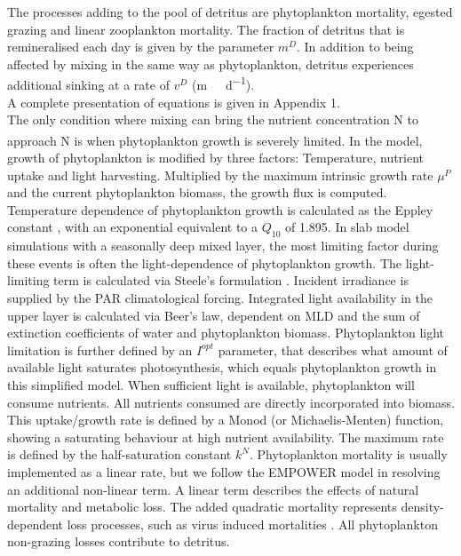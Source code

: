 \documentclass[template.tex]{subfiles}
\begin{document}
The processes adding to the pool of detritus are phytoplankton mortality, egested grazing and linear zooplankton mortality. The fraction of detritus that is remineralised each day is given by the parameter $m
^D$. In addition to being affected by mixing in the same way as phytoplankton, detritus experiences additional sinking at a rate of $v^D$ (\unit{m \ d^{-1}}).\\

A complete presentation of equations is given in Appendix 1.\\


The only condition where mixing can bring the nutrient concentration N to approach \unit{N^\emptyset} is when phytoplankton growth is severely limited. In the model, growth of phytoplankton is modified by three factors: Temperature, nutrient uptake and light harvesting. Multiplied by the maximum intrinsic growth rate $\mu^P$ and the current phytoplankton biomass, the growth flux is computed. Temperature dependence of phytoplankton growth is calculated as the Eppley constant \citep{Eppley1972TemperatureSea}, with an exponential equivalent to a $Q_{10}$ of 1.895.
In slab model simulations with a seasonally deep mixed layer, the most limiting factor during these events is often the light-dependence of phytoplankton growth. The light-limiting term is calculated via Steele's formulation \citep{Steele1962EnvironmentalSea}. Incident irradiance is supplied by the PAR climatological forcing. Integrated light availability in the upper layer is calculated via Beer's law, dependent on MLD and the sum of extinction coefficients of water and phytoplankton biomass. Phytoplankton light limitation is further defined by an $I
^{opt}$ parameter, that describes what amount of available light saturates photosynthesis, which equals phytoplankton growth in this simplified model.
When sufficient light is available, phytoplankton will consume nutrients. All nutrients consumed are directly incorporated into biomass. This uptake/growth rate is defined by a Monod (or Michaelis-Menten) function, showing a saturating behaviour at high nutrient availability. The maximum rate is defined by the half-saturation constant $k^N$. 
Phytoplankton mortality is usually implemented as a linear rate, but we follow the EMPOWER model in resolving an additional non-linear term. A linear term describes the effects of natural mortality and metabolic loss. The added quadratic mortality represents density-dependent loss processes, such as virus induced mortalities \citep{Anderson2015c}.  
All phytoplankton non-grazing losses contribute to detritus.\\
\end{document}
